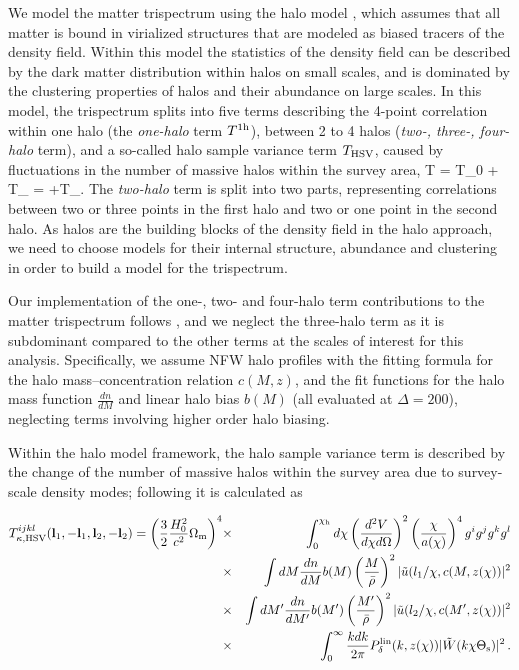 We model the matter trispectrum using the halo model \citep{Seljak00, CS02}, which assumes that all matter is bound in virialized structures that are modeled as biased tracers of the density field. Within this model the statistics of the density field can be described by the dark matter distribution within halos on small scales, and is dominated by the clustering properties of halos and their abundance on large scales. In this model, the trispectrum splits into five terms describing the 4-point correlation within one halo (the \emph{one-halo} term $T^{\mathrm{1h}}$), between 2 to 4 halos (\emph{two-, three-, four-halo} term), and a so-called halo sample variance term $T_{\mathrm{HSV}}$, caused by fluctuations in the number of massive halos within the survey area,
\be
\label{eq:t}
T = T_0 + T_{} = \left[T_{\mr{1h}}+T_{\mr{2h}}+T_{\mr{3h}}+T_{\mr{4h}}\right]+T_{}\;.
\ee
The \emph{two-halo} term is split into two parts, representing correlations between two or three points in the first halo and two or one point in the second halo. As halos are the building blocks of the density field in the halo approach, we need to choose models for their internal structure, abundance and clustering in order to build a model for the trispectrum. 


Our implementation of the one-, two- and four-halo term contributions to the matter trispectrum follows \citet{CH01}, and we neglect the three-halo term as it is subdominant compared to the other terms at the scales of interest for this analysis. Specifically, we assume NFW halo profiles \citep{NFW} with the \citet{Bhattacharya11} fitting formula for the halo mass--concentration relation $c(M,z)$, and the \citet{Tinker10} fit functions for the halo mass function $\frac{ dn}{dM}$ and linear halo bias $b(M)$ (all evaluated at $\Delta = 200$), neglecting terms involving higher order halo biasing.


Within the halo model framework, the halo sample variance term is described by the change of the number of massive halos within the survey area due to survey-scale density modes; following \citet{sht09} it is calculated as

\begin{eqnarray}
T_{\kappa,\rm{HSV}}^{ijkl}(\mathbf l_1,-\mathbf l_1,\mathbf l_2,-\mathbf l_2)= \left(\frac{3}{2}\frac{H_0^2}{c^2}\Omega_{\mathrm m}\right)^4 &\times&  \int_0^{\chi_\mathrm h}d\chi \left(\frac{d^2 V}{d\chi d\Omega}\right)^2 \left(\frac{\chi}{a(\chi)}\right)^4 g^i g^j g^k g^l \nonumber \\
&\times&  \int d M \frac{d n}{d M} b(M)\left(\frac{M}{\bar{\rho}}\right)^2 |\tilde{u}(l_1/\chi, c(M,z(\chi))|^2 \nonumber \\
 &\times& \int d M' \frac{d n}{d M'} b(M')\left(\frac{M'}{\bar{\rho}}\right)^2 |\tilde{u}(l_2/\chi, c(M',z(\chi))|^2 \nonumber \\
 &\times&  \int_0^\infty \frac{k dk}{2\pi}P_\delta^{\mathrm{lin}}(k,z(\chi))|\tilde W(k\chi \Theta_{\mathrm s})|^2 \,.
\end{eqnarray}


